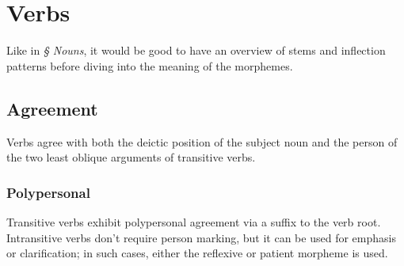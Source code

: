 

\setchapterpreamble[u]{\margintoc}
\chapter{Verbs}

\begin{kaobox}[frametitle=\sc todo:]
    Like in \emph{§ Nouns}, it would be good to have an overview of stems and inflection patterns before diving into the meaning of the morphemes.
\end{kaobox}

\section{Agreement}
Verbs agree with both the deictic position of the subject noun and the person of the two least oblique arguments of transitive verbs.


\subsection{Polypersonal}
Transitive verbs exhibit polypersonal agreement via a suffix to the verb root. Intransitive verbs don't require person marking, but it can be used for emphasis or clarification; in such cases, either the reflexive or  patient morpheme is used.


